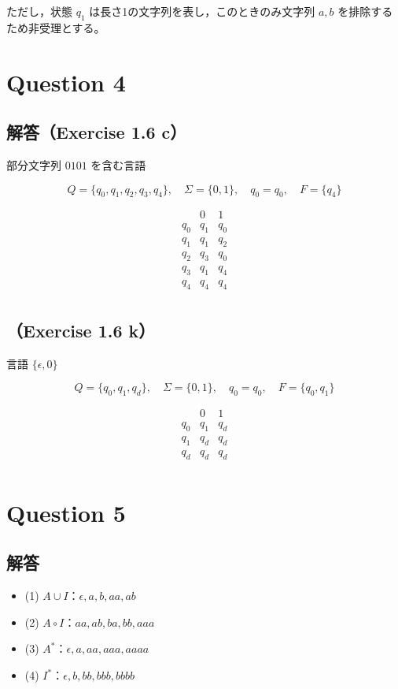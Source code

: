 \documentclass[uplatex,a4paper,11pt]{jsarticle}
\begin{document}
ただし，状態 $q_1$ は長さ1の文字列を表し，このときのみ文字列 $a,b$ を排除するため非受理とする。

\section*{Question 4}
\subsection*{解答（Exercise 1.6 c）}

部分文字列 $0101$ を含む言語

\[
Q=\{q_0,q_1,q_2,q_3,q_4\},\quad \Sigma=\{0,1\},\quad q_0=q_0,\quad F=\{q_4\}
\]

\[
\begin{array}{c|cc}
 & 0 & 1 \\
\hline
q_0 & q_1 & q_0 \\
q_1 & q_1 & q_2 \\
q_2 & q_3 & q_0 \\
q_3 & q_1 & q_4 \\
q_4 & q_4 & q_4 \\
\end{array}
\]

\subsection*{（Exercise 1.6 k）}

言語 $\{\epsilon,0\}$

\[
Q=\{q_0,q_1,q_d\},\quad \Sigma=\{0,1\},\quad q_0=q_0,\quad F=\{q_0,q_1\}
\]

\[
\begin{array}{c|cc}
 & 0 & 1 \\
\hline
q_0 & q_1 & q_d \\
q_1 & q_d & q_d \\
q_d & q_d & q_d \\
\end{array}
\]

\section*{Question 5}
\subsection*{解答}

\begin{itemize}
\item (1) $A \cup I$：$\epsilon, a, b, aa, ab$
\item (2) $A \circ I$：$aa, ab, ba, bb, aaa$
\item (3) $A^*$：$\epsilon, a, aa, aaa, aaaa$
\item (4) $I^*$：$\epsilon, b, bb, bbb, bbbb$
\end{itemize}
\end{document}
